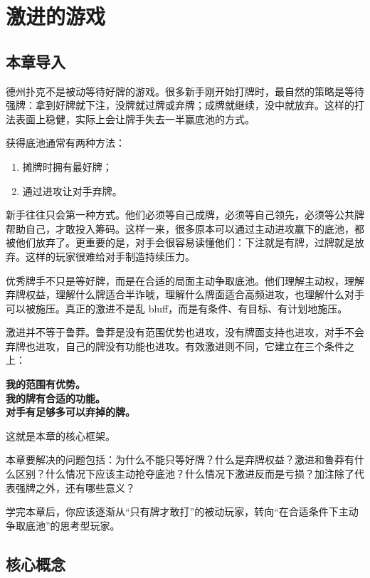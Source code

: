\chapter{激进的游戏}

\section{本章导入}

德州扑克不是被动等待好牌的游戏。很多新手刚开始打牌时，最自然的策略是等待强牌：拿到好牌就下注，没牌就过牌或弃牌；成牌就继续，没中就放弃。这样的打法表面上稳健，实际上会让牌手失去一半赢底池的方式。

获得底池通常有两种方法：

\begin{enumerate}
\item 摊牌时拥有最好牌；
\item 通过进攻让对手弃牌。
\end{enumerate}

新手往往只会第一种方式。他们必须等自己成牌，必须等自己领先，必须等公共牌帮助自己，才敢投入筹码。这样一来，很多原本可以通过主动进攻赢下的底池，都被他们放弃了。更重要的是，对手会很容易读懂他们：下注就是有牌，过牌就是放弃。这样的玩家很难给对手制造持续压力。

优秀牌手不只是等好牌，而是在合适的局面主动争取底池。他们理解主动权，理解弃牌权益，理解什么牌适合半诈唬，理解什么牌面适合高频进攻，也理解什么对手可以被施压。真正的激进不是乱 bluff，而是有条件、有目标、有计划地施压。

激进并不等于鲁莽。鲁莽是没有范围优势也进攻，没有牌面支持也进攻，对手不会弃牌也进攻，自己的牌没有功能也进攻。有效激进则不同，它建立在三个条件之上：

\begin{center}
\textbf{我的范围有优势。\\
我的牌有合适的功能。\\
对手有足够多可以弃掉的牌。}
\end{center}

这就是本章的核心框架。

本章要解决的问题包括：为什么不能只等好牌？什么是弃牌权益？激进和鲁莽有什么区别？什么情况下应该主动抢夺底池？什么情况下激进反而是亏损？加注除了代表强牌之外，还有哪些意义？

学完本章后，你应该逐渐从“只有牌才敢打”的被动玩家，转向“在合适条件下主动争取底池”的思考型玩家。

\section{核心概念}

